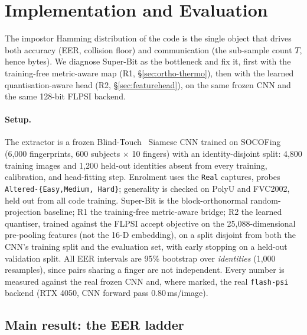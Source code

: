 \section{Implementation and Evaluation}
\label{sec:eval}

The impostor Hamming distribution of the code is the single object that drives both accuracy (EER,
collision floor) and communication (the sub-sample count $T$, hence bytes). We diagnose Super-Bit as
the bottleneck and fix it, first with the training-free metric-aware map (R1, \S\ref{sec:ortho-thermo}),
then with the learned quantisation-aware head (R2, \S\ref{sec:featurehead}), on the same frozen CNN and
the same 128-bit FLPSI backend.

\paragraph{Setup.} The extractor is a frozen Blind-Touch~\cite{ChoiWooKim24} Siamese CNN trained on
SOCOFing~\cite{Shehu18} (6,000 fingerprints, 600 subjects $\times$ 10 fingers) with an identity-disjoint
split: 4,800 training images and 1,200 held-out identities absent from every training, calibration, and
head-fitting step. Enrolment uses the \texttt{Real} captures, probes \texttt{Altered-\{Easy,Medium,
Hard\}}; generality is checked on PolyU and FVC2002, held out from all code training. Super-Bit is the
block-orthonormal random-projection baseline; R1 the training-free metric-aware bridge; R2 the learned
quantiser, trained against the FLPSI accept objective on the 25,088-dimensional pre-pooling features
(not the 16-D embedding), on a split disjoint from both the CNN's training split and the evaluation
set, with early stopping on a held-out validation split. All EER intervals are 95\% bootstrap over
\emph{identities} (1,000 resamples), since pairs sharing a finger are not independent. Every number is
measured against the real frozen CNN and, where marked, the real \texttt{flash-psi} backend
(RTX 4050, CNN forward pass 0.80\,ms/image).

\subsection{Main result: the EER ladder}
\label{sec:eval-ladder}

